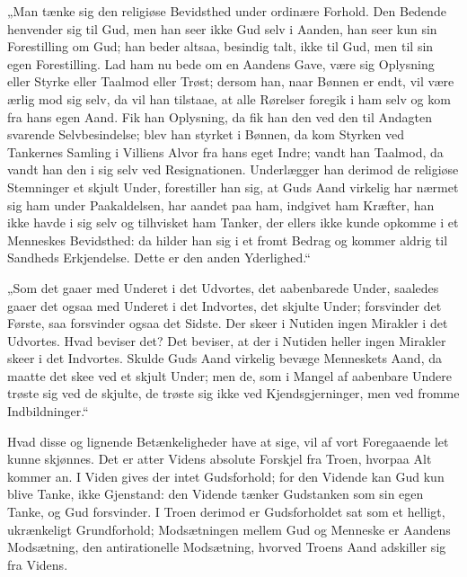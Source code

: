 \documentclass[12pt]{book}
\begin{document}
„Man tænke sig den religiøse Bevidsthed under ordinære Forhold. Den
Bedende henvender sig til Gud, men han seer ikke Gud selv i Aanden,
han seer kun sin Forestilling om Gud; han beder altsaa, besindig
talt, ikke til Gud, men til sin egen Forestilling. Lad ham nu bede
om en Aandens Gave, være sig Oplysning eller Styrke eller Taalmod
eller Trøst; dersom han, naar Bønnen er endt, vil være ærlig mod sig
selv, da vil han tilstaae, at alle Rørelser foregik i ham selv og
kom fra hans egen Aand. Fik han Oplysning, da fik han den ved den
til Andagten svarende Selvbesindelse; blev han styrket i Bønnen, da
kom Styrken ved Tankernes Samling i Villiens
Alvor fra hans eget Indre; vandt han Taalmod, da vandt han den i sig
selv ved Resignationen. Underlægger han derimod de religiøse
Stemninger et skjult Under, forestiller han sig, at Guds Aand
virkelig har nærmet sig ham under Paakaldelsen, har aandet paa ham,
indgivet ham Kræfter, han ikke havde i sig selv og tilhvisket ham
Tanker, der ellers ikke kunde opkomme i et Menneskes Bevidsthed: da
hilder han sig i et fromt Bedrag og kommer aldrig til Sandheds
Erkjendelse. Dette er den anden Yderlighed.“

„Som det gaaer med Underet i det Udvortes, det aabenbarede Under,
saaledes gaaer det ogsaa med Underet i det Indvortes, det skjulte
Under; forsvinder det Første, saa forsvinder ogsaa det Sidste. Der
skeer i Nutiden ingen Mirakler i det Udvortes. Hvad beviser det? Det
beviser, at der i Nutiden heller ingen Mirakler skeer i det
Indvortes. Skulde Guds Aand virkelig bevæge Menneskets Aand, da
maatte det skee ved et skjult Under; men de, som i Mangel af
aabenbare Undere trøste sig ved de skjulte, de trøste sig ikke ved
Kjendsgjerninger, men ved fromme Indbildninger.“

Hvad disse og lignende Betænkeligheder have at sige, vil af vort
Foregaaende let kunne skjønnes. Det er atter Videns absolute
Forskjel fra Troen, hvorpaa Alt kommer an. I Viden gives der intet
Gudsforhold; for den Vidende kan Gud kun blive Tanke, ikke
Gjenstand: den Vidende tænker Gudstanken som sin egen Tanke, og Gud
forsvinder. I Troen derimod er Gudsforholdet sat som et helligt,
ukrænkeligt Grundforhold; Modsætningen mellem Gud og Menneske er
Aandens Modsætning, den antirationelle Modsætning, hvorved Troens
Aand adskiller sig fra Videns.
\end{document}
